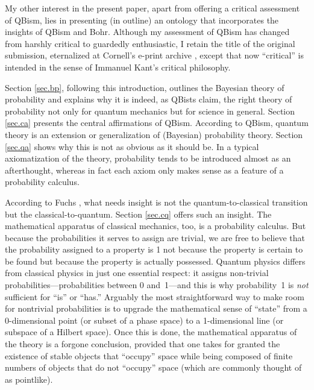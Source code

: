 \documentclass[12pt]{article}
\begin{document}
My other interest in the present paper, apart from offering a critical assessment of QBism, lies in presenting (in outline) an ontology that incorporates the insights of QBism and Bohr. Although my assessment of QBism has changed from harshly critical to guardedly enthusiastic, I retain the title of the original submission, eternalized at Cornell's e-print archive \cite{QBCAv1}, except that now ``critical'' is intended in the sense of Immanuel Kant's critical philosophy.

Section \ref{sec.bp}, following this introduction, outlines the Bayesian theory of probability and explains why it is indeed, as QBists claim, the right theory of probability not only for quantum mechanics but for science in general. Section \ref{sec.ca} presents the central affirmations of QBism. According to QBism, quantum theory is an extension or generalization of (Bayesian) probability theory. Section \ref{sec.qa} shows why this is not as obvious as it should be. In a typical axiomatization of the theory, probability tends to be introduced almost as an afterthought, whereas in fact each axiom only makes sense as a feature of a probability calculus.

According to Fuchs \cite{FuchsPeri}, what needs insight is not the quantum-to-classical transition but the classical-to-quantum. Section \ref{sec.cq} offers such an insight. The mathematical apparatus of classical mechanics, too, is a probability calculus. But because the probabilities it serves to assign are trivial, we are free to believe that the probability assigned to a property is 1 not because the property is certain to be found but because the property is actually possessed. Quantum physics differs from classical physics in just one essential respect: it assigns non-trivial probabilities---probabilities between 0 and~1---and this is why probability~1 is \emph{not} sufficient for ``is'' or ``has.'' Arguably the most straightforward way to make room for nontrivial probabilities is to upgrade the mathematical sense of ``state'' from a \hbox{0-dimensional} point (or subset of a phase space) to a 1-dimensional line (or subspace of a Hilbert space). Once this is done, the mathematical apparatus of the theory is a forgone conclusion, provided that one takes for granted the existence of stable objects that ``occupy'' space while being composed of finite numbers of objects that do not ``occupy'' space (which are commonly thought of as pointlike).
\end{document}
